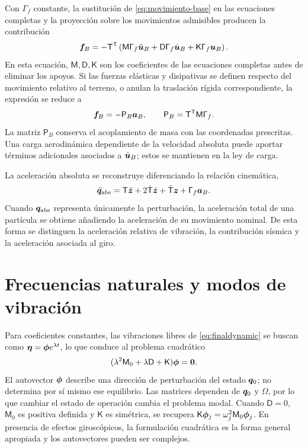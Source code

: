 Con $\mathsf\Gamma_f$ constante, la sustitución de \eqref{eq:movimiento-base} en las ecuaciones completas y la proyección sobre los movimientos admisibles producen la contribución
\begin{equation}
 \bm{f}_B=-\mathsf T^\mathsf T\left(
 \mathsf M\mathsf\Gamma_f\ddot{\bm{u}}_B+
 \mathsf D\mathsf\Gamma_f\dot{\bm{u}}_B+
 \mathsf K\mathsf\Gamma_f\bm{u}_B\right).
 \label{eq:sismo-general}
\end{equation}
En esta ecuación, $\mathsf M,\mathsf D,\mathsf K$ son los coeficientes de las ecuaciones completas antes de eliminar los apoyos. Si las fuerzas elásticas y disipativas se definen respecto del movimiento relativo al terreno, o anulan la traslación rígida correspondiente, la expresión se reduce a
\begin{equation}
 \bm{f}_B=-\mathsf P_B\bm{a}_B,\qquad
 \mathsf P_B=\mathsf T^\mathsf T\mathsf M\mathsf\Gamma_f.
 \label{eq:sismo-inercia}
\end{equation}
La matriz $\mathsf P_B$ conserva el acoplamiento de masa con las coordenadas prescritas. Una carga aerodinámica dependiente de la velocidad absoluta puede aportar términos adicionales asociados a $\dot{\bm{u}}_B$; estos se mantienen en la ley de carga.

La aceleración absoluta se reconstruye diferenciando la relación cinemática,
\begin{equation}
 \ddot{\bm{q}}_{\mathrm{abs}}
 =\mathsf T\ddot{\bm{z}}
  +2\dot{\mathsf T}\dot{\bm{z}}
  +\ddot{\mathsf T}\bm{z}
  +\mathsf\Gamma_f\bm{a}_B.
\end{equation}
Cuando $\bm{q}_{\mathrm{abs}}$ representa únicamente la perturbación, la aceleración total de una partícula se obtiene añadiendo la aceleración de su movimiento nominal. De esta forma se distinguen la aceleración relativa de vibración, la contribución sísmica y la aceleración asociada al giro.

\section{Frecuencias naturales y modos de vibración}
Para coeficientes constantes, las vibraciones libres de \eqref{eq:finaldynamic} se buscan como $\bm{\eta}=\bm{\phi} e^{\lambda t}$, lo que conduce al problema cuadrático \cite{tisseur}
\begin{equation}
 (\lambda^2\mathsf M_0+\lambda\mathsf D+\mathsf K)\bm{\phi}=\bm{0}.
\end{equation}
El autovector $\bm{\phi}$ describe una dirección de perturbación del estado $\bm{q}_0$; no determina por sí mismo ese equilibrio. Las matrices dependen de $\bm{q}_0$ y $\Omega$, por lo que cambiar el estado de operación cambia el problema modal. Cuando $\mathsf D=0$, $\mathsf M_0$ es positiva definida y $\mathsf K$ es simétrica, se recupera $\mathsf K\bm{\phi}_j=\omega_j^2\mathsf M_0\bm{\phi}_j$. En presencia de efectos giroscópicos, la formulación cuadrática es la forma general apropiada y los autovectores pueden ser complejos.

